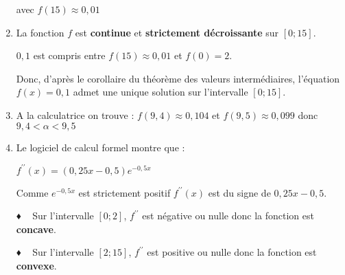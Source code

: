 \begin{corrige}
\begin{enumerate}
\begin{center}
\begin{extern}
{
      }
   \end{extern}
\end{center}
avec $f\left(15\right)\approx 0,01$
          \item
          La fonction $f$ est \textbf{continue} et \textbf{strictement décroissante} sur $\left[0; 15\right]$.
          \par
          $0,1$ est compris entre $f\left(15\right)\approx 0,01$ et $f\left(0\right)=2$.
          \par
          Donc, d'après le corollaire du théorème des valeurs intermédiaires, l'équation $f\left(x\right)=0,1$ admet une unique solution sur l'intervalle $\left[0; 15\right]$.
          \item
          A la calculatrice on trouve : $f\left(9,4\right)\approx 0,104$ et $f\left(9,5\right)\approx 0,099$ donc $9,4 < \alpha  < 9,5$
          \item
          Le logiciel de calcul formel montre que :
          \par
          $f^{\prime\prime}\left(x\right) = \left(0,25x-0,5\right) e^{-0,5x}$
          \par
          Comme $e^{- 0,5x}$ est strictement positif $f^{\prime\prime}\left(x\right)$ est du signe de $0,25x-0,5$.
          \par
          ♦ ~ Sur l'intervalle $\left[0; 2\right]$, $f^{\prime\prime}$ est négative ou nulle donc la fonction est \textbf{concave}.
          \par
          ♦ ~ Sur l'intervalle $\left[2; 15\right]$, $f^{\prime\prime}$ est positive ou nulle donc la fonction est \textbf{convexe}.

\end{enumerate}
\end{corrige}
